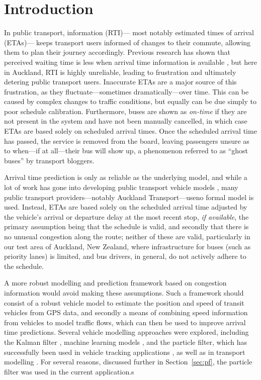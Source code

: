 \section{Introduction}
\label{sec:intro}


In public transport, \rt information (RTI)---%
most notably estimated times of arrival (ETAs)---%
keeps transport users informed of changes to their commute,
allowing them to plan their journey accordingly.
Previous research has shown that perceived waiting time is less
when arrival time information is available \citep{TCRP_2003b},
but here in Auckland, RTI is highly unreliable,
leading to frustration and ultimately detering public transport users.
Inaccurate ETAs are a major source of this frustration,
as they fluctuate---sometimes dramatically---over time.
This can be caused by complex changes to traffic conditions,
but equally can be due simply to poor schedule calibration.
Furthermore, buses are shown as \emph{on-time} 
if they are not present in the \rt system and have not been manually cancelled,
in which case ETAs are based solely on scheduled arrival times.
Once the scheduled arrival time has passed,
the service is removed from the \rt board,
leaving passengers unsure as to when---if at all---their bus will show up,
a phenomenon referred to as ``ghost buses'' by transport bloggers.


Arrival time prediction is only as reliable as the underlying model,
and while a lot of work has gone into developing public transport vehicle models
\citep{Cathey_2003,Jeong_2005,Yu_2011,Hans_2015},
many public transport providers---notably Auckland Transport---useno formal model is used.
Instead, ETAs are based solely on the scheduled arrival time
adjusted by the vehicle's arrival or departure delay at the most recent stop, 
\emph{if available},
the primary assumption being that the schedule is valid,
and secondly that there is no unusual congestion along the route;
neither of these are valid,
particularly in our test area of Auckland, New Zealand,
where infrastructure for buses (such as priority lanes) is limited,
and bus drivers, in general, 
do not actively adhere to the schedule.


A more robust modelling and prediction framework 
based on \rt congestion information would avoid making these assumptions.
Such a framework should consist of a robust vehicle model to estimate the position and speed
of transit vehicles from \rt GPS data,
and secondly a means of combining speed information from vehicles
to model traffic flows,
which can then be used to improve arrival time predictions.
Several vehicle modelling approaches were explored, 
including the Kalman filter \citep{Dailey_2001,Cathey_2003},
machine learning models \citep{Yu_2006,Chang_2010},
and the particle filter,
which has successfully been used in vehicle tracking applications
\citep{cn},
as well as in transport modelling \citep{Hans_2015}.
For several reasons, discussed further in Section~\ref{sec:pf},
the particle filter was used in the current application.s


